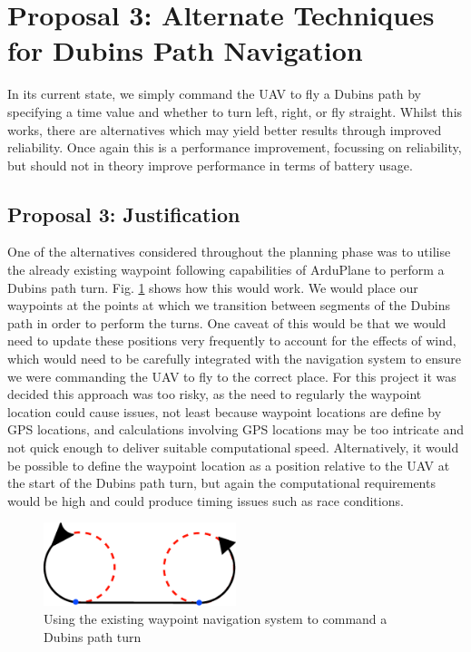 \section{Proposal 3: Alternate Techniques for Dubins Path Navigation} 
\label{future:alternatedubins}
In its current state, we simply command the UAV to fly a Dubins path by specifying a time value and whether to turn left, right, or fly straight. Whilst this works, there are alternatives which may yield better results through improved reliability. Once again this is a performance improvement, focussing on reliability, but should not in theory improve performance in terms of battery usage.

\subsection{Proposal 3: Justification}
\label{future:alternatedubinsreason}
One of the alternatives considered throughout the planning phase was to utilise the already existing waypoint following capabilities of ArduPlane to perform a Dubins path turn. Fig. \ref{fig:waypointdubins} shows how this would work. We would place our waypoints at the points at which we transition between segments of the Dubins path in order to perform the turns. One caveat of this would be that we would need to update these positions very frequently to account for the effects of wind, which would need to be carefully integrated with the navigation system to ensure we were commanding the UAV to fly to the correct place. For this project it was decided this approach was too risky, as the need to regularly the waypoint location could cause issues, not least because waypoint locations are define by GPS locations, and calculations involving GPS locations may be too intricate and not quick enough to deliver suitable computational speed. Alternatively, it would be possible to define the waypoint location as a position relative to the UAV at the start of the Dubins path turn, but again the computational requirements would be high and could produce timing issues such as race conditions. 

\begin{figure}[htbp!] 
\centering    
\includegraphics[width=0.5\textwidth]{WaypointDubins}
\caption[Commanding a Dubins path turn using waypoint navigation]{Using the existing waypoint navigation system to command a Dubins path turn}
\label{fig:waypointdubins}
\end{figure} 

